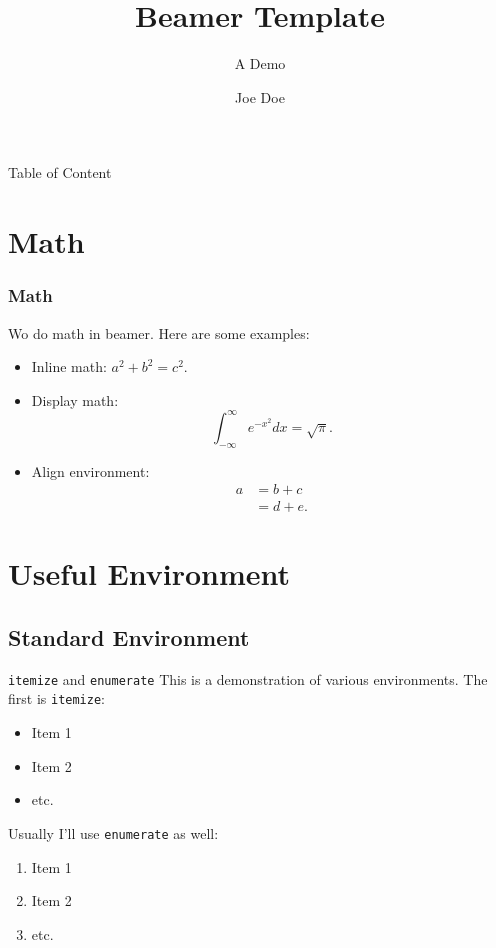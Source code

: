 \documentclass[aspectratio=169, xcolor={dvipsnames}, hyperref={colorlinks=true,linkcolor=themecolor, urlcolor=magenta,citecolor=violet, hyperfootnotes=true}]{beamer}
\title{Beamer Template}
\subtitle{A Demo}
\institute[JHU]{Johns Hopkins University}
\author{Joe Doe}
\begin{document}
\begin{frame}
    \titlepage
\end{frame}

\begin{frame}{Table of Content}
    \tableofcontents[hideallsubsections]
\end{frame}

\section{Math}
\begin{frame}
    \frametitle{Math}
    Wo do math in beamer. Here are some examples:
    \begin{itemize}
        \item Inline math: $a^2 + b^2 = c^2$.
        \item Display math:
              \begin{equation}
                  \int_{-\infty}^{\infty} e^{-x^2} dx = \sqrt{\pi}.
              \end{equation}
        \item Align environment:
              \begin{align}
                  a & = b + c \\
                  & = d + e.
              \end{align}
    \end{itemize}
\end{frame}


\section{Useful Environment}
\subsection{Standard Environment}
\begin{frame}{\texttt{itemize} and \texttt{enumerate}}
    This is a demonstration of various environments. The first is \texttt{itemize}:

    \begin{itemize}
        \item Item 1
        \item Item 2
        \item etc.
    \end{itemize}

    Usually I'll use \texttt{enumerate} as well:

    \begin{enumerate}
        \item Item 1
        \item Item 2
        \item etc.
    \end{enumerate}
\end{frame}
\end{document}
